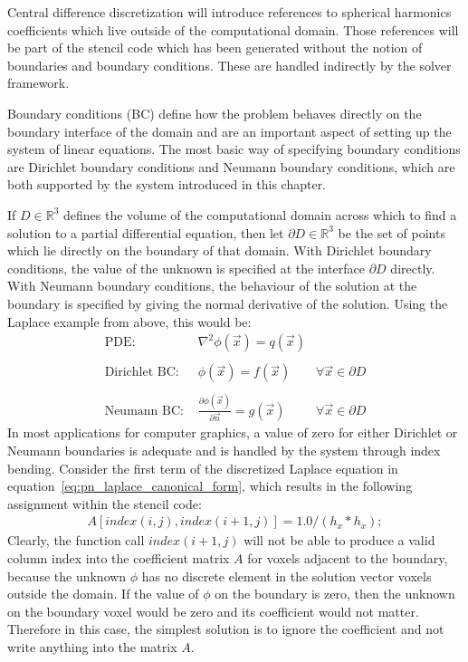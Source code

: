 Central difference discretization will introduce references to spherical harmonics coefficients which live outside of the computational domain. Those references will be part of the stencil code which has been generated without the notion of boundaries and boundary conditions. These are handled indirectly by the solver framework.

Boundary conditions (BC) define how the problem behaves directly on the boundary interface of the domain and are an important aspect of setting up the system of linear equations. The most basic way of specifying boundary conditions are Dirichlet boundary conditions and Neumann boundary conditions, which are both supported by the system introduced in this chapter.

If $D\in\mathbb{R}^3$ defines the volume of the computational domain across which to find a solution to a partial differential equation, then let $\partial D\in\mathbb{R}^3$ be the set of points which lie directly on the boundary of that domain. With Dirichlet boundary conditions, the value of the unknown is specified at the interface $\partial D$ directly. With Neumann boundary conditions, the behaviour of the solution at the boundary is specified by giving the normal derivative of the solution. Using the Laplace example from above, this would be:
\begin{align*}
\text{PDE:\ \ } & \nabla^2\phi\left(\vec{x}\right) = q\left(\vec{x}\right)
&
\\
\\
\text{Dirichlet BC:\ \ } & \phi\left(\vec{x}\right) = f\left(\vec{x}\right)
&\forall \vec{x}\in\partial D
\\
\\
\text{Neumann BC:\ \ } & \frac{\partial\phi\left(\vec{x}\right)}{\partial\vec{n}} = g\left(\vec{x}\right)
&\forall \vec{x}\in\partial D
\end{align*}
In most applications for computer graphics, a value of zero for either Dirichlet or Neumann boundaries is adequate and is handled by the system through index bending. Consider the first term of the discretized Laplace equation in equation~\ref{eq:pn_laplace_canonical_form}, which results in the following assignment within the stencil code:
\begin{align}
A[index(i,j), index(i+1, j)] = 1.0/(h_x*h_x);
\end{align}
Clearly, the function call $index(i+1, j)$ will not be able to produce a valid column index into the coefficient matrix $A$ for voxels adjacent to the boundary, because the unknown $\phi$ has no discrete element in the solution vector voxels outside the domain. If the value of $\phi$ on the boundary is zero, then the unknown on the boundary voxel would be zero and its coefficient would not matter. Therefore in this case, the simplest solution is to ignore the coefficient and not write anything into the matrix $A$.

